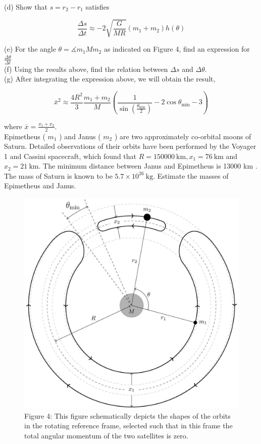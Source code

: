 \documentclass[10pt]{article}
\begin{document}
(d) Show that $s=r_{2}-r_{1}$ satisfies


\begin{equation*}
\frac{\Delta s}{\Delta t} \approx-2 \sqrt{\frac{G}{M R}}\left(m_{1}+m_{2}\right) h(\theta) \tag{8pt}
\end{equation*}


(e) For the angle $\theta=\measuredangle m_{1} M m_{2}$ as indicated on Figure 4, find an expression for $\frac{\Delta \theta}{\Delta t}$\\
(f) Using the results above, find the relation between $\Delta s$ and $\Delta \theta$.\\
(g) After integrating the expression above, we will obtain the result,

$$
\bar{x}^{2} \approx \frac{4 R^{2}}{3} \frac{m_{1}+m_{2}}{M}\left(\frac{1}{\sin \left(\frac{\theta_{\min }}{2}\right)}-2 \cos \theta_{\min }-3\right)
$$

where $\bar{x}=\frac{x_{1}+x_{2}}{2}$.\\
Epimetheus ( $m_{1}$ ) and Janus ( $m_{2}$ ) are two approximately co-orbital moons of Saturn. Detailed observations of their orbits have been performed by the Voyager 1 and Cassini spacecraft, which found that $R=150000 \mathrm{~km}, x_{1}=76 \mathrm{~km}$ and $x_{2}=21 \mathrm{~km}$. The minimum distance between Janus and Epimetheus is 13000 km . The mass of Saturn is known to be $5.7 \times 10^{26} \mathrm{~kg}$. Estimate the masses of Epimetheus and Janus.

\begin{figure}[h]
\begin{center}
  \includegraphics[width=\textwidth]{2025_09_11_6312450c103d6a7e5736g-09}
\captionsetup{labelformat=empty}
\caption{Figure 4: This figure schematically depicts the shapes of the orbits in the rotating reference frame, selected such that in this frame the total angular momentum of the two satellites is zero.}
\end{center}
\end{figure}
\end{document}
